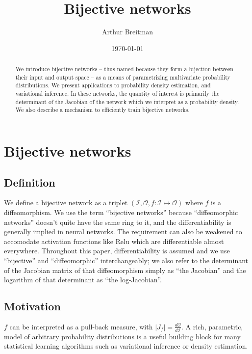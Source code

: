 \documentclass{article}
\title{Bijective networks}
\author{Arthur Breitman}
\date{\today}
\begin{document}
\maketitle

\begin{abstract}
  We introduce bijective networks -- thus named because they form a bijection
  between their input and output space -- as a means of parametrizing
  multivariate probability distributions. We present applications to probability
  density estimation, and variational inference. In these networks, the quantity
  of interest is primarily the determinant of the Jacobian of the network which
  we interpret as a probability density. We also describe a mechanism to
  efficiently train bijective networks.
\end{abstract}

\section{Bijective networks}

\subsection{Definition}

We define a bijective network as a triplet
\((\mathcal{I}, \mathcal{O}, f  : \mathcal{I} \mapsto \mathcal{O})\)
where \(f\) is a diffeomorphism. We use the term ``bijective networks''
because ``diffeomorphic networks'' doesn't quite have the same ring to it,
and the differentiability is generally implied in neural networks. The
requirement can also be weakened to accomodate activation functions like
Relu which are differentiable almost everywhere. Throughout this paper,
differentiability is assumed and we use ``bijective'' and ``diffeomorphic''
interchangeably; we also refer to the determinant of the Jacobian matrix
of that diffeomorphism simply as ``the Jacobian'' and the logarithm of
that determinant as ``the log-Jacobian''.

\subsection{Motivation}

\(f\) can be interpreted as a pull-back  measure, with
\(\left|J_f\right| = \frac{d \mathcal{O}}{d \mathcal{I}}\). A rich, parametric,
model of arbitrary probability distributions is a useful building block for many
statistical learning algorithms such as variational inference or density
estimation.
\end{document}
